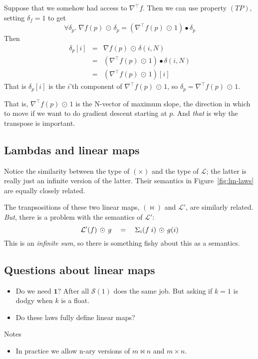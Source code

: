 \documentclass[sigplan,review]{acmart}
\newcommand{\gradf}[1]{\nabla\! #1}  %
\newcommand{\gradft}[1]{\nabla^{\top}\!#1}  %
\newcommand{\deltafun}[2]{\delta(#1,#2)}
\renewcommand{\d}[1]{\delta_{\mathit{#1}}}   %
\newcommand{\dotprod}{\bullet}    %
\newcommand{\lmcomp}{\,\circ\,}   %
\newcommand{\lmpair}{\times}         %
\newcommand{\lmjoin}{\bowtie}        %
\newcommand{\lmapply}{\,\odot\,}      %
\newcommand{\lmone}{\mathbf{1}}      %
\newcommand{\lmscalar}[1]{{\mathcal S}(#1)}      %
\newcommand{\lmlam}{{\mathcal L}}      %
\newcommand{\lmlamt}{{\mathcal L'}}     %
\newcommand{\simon}[1]{}
\newcommand{\awf}[1]{}
\begin{document}
Suppose that we somehow had access to $\gradft{f}$.  Then we can use property $(TP)$, setting $\d{f} = 1$
to get
$$
\forall \d{p}.\; \gradf{f}(p) \lmapply \d{p} = (\gradft{f}(p) \lmapply 1) \dotprod \d{p}
$$
Then
$$
\begin{array}{rcl}
  \d{p}[i] & = & \gradf{f}(p) \lmapply \deltafun i N \\
  & = & (\gradft{f}(p) \lmapply 1) \dotprod \deltafun i N \\
  & = & (\gradft{f}(p) \lmapply 1)[i]
\end{array}
$$
That is $\d{p}[i]$ is the $i$'th component of $\gradft{f}(p) \lmapply 1$,
so $\d{p} = \gradft{f}(p) \lmapply 1$.

That is, $\gradft{f}(p) \lmapply 1$ is the N-vector of maximum slope, the direction in which to
move if we want to do gradient descent starting at $p$.  And \emph{that} is why the transpose
is important.

\subsection{Lambdas and linear maps}

Notice the similarity between the type of $(\lmpair)$ and the type of $\lmlam$; the latter is really
just an infinite version of the latter.
Their semantics in Figure~\ref{fig:lm-laws} are equally closely  related.

The tranpsositions of these two linear maps, $(\lmjoin)$ and $\lmlamt$, are
similarly related. \emph{But}, there is a problem with the semantics of
$\lmlamt$:
$$
   \lmlamt(f) \lmapply g \quad = \quad \Sigma_i (f \;i) \lmapply g(i) \\
$$
This is an \emph{infinite sum}, so there is something fishy about this as a semantics.


\subsection{Questions about linear maps}

\begin{itemize}
\item Do we need $\lmone$? After all $\lmscalar{1}$ does the same job.
  But asking if $k=1$ is dodgy when $k$ is a float. \awf{No, perfectly fine to ask if a
    float is 1 --- the nearby floats are far away, and there's no other float $f$ such that $\lmscalar f = \lmone$.}
  \simon{For the purposes of this paper I prefer having $\lmone$ as well; unity plays such a key role!}
\item Do these laws fully define linear maps?
\end{itemize}
Notes
\begin{itemize}
\item In practice we allow n-ary versions of $m \lmjoin n$ and $m \lmpair n$.
\end{itemize}
\end{document}
